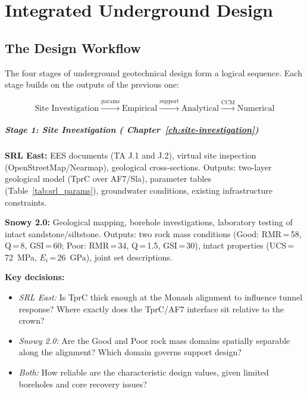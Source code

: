 \chapter{Integrated Underground Design}
\label{ch:integrated-design}

\section{The Design Workflow}

The four stages of underground geotechnical design form a logical sequence. Each stage builds on the outputs of the previous one:

\[
\text{Site Investigation} \xrightarrow{\text{params}} \text{Empirical} \xrightarrow{\text{support}} \text{Analytical} \xrightarrow{\text{CCM}} \text{Numerical}
\]

\paragraph{Stage 1: Site Investigation ( Chapter~\ref{ch:site-investigation})}

\textbf{SRL East:} EES documents (TA J.1 and J.2), virtual site inspection (OpenStreetMap/Nearmap), geological cross-sections. Outputs: two-layer geological model (TprC over AF7/Sla), parameter tables (Table~\ref{tab:srl_params}), groundwater conditions, existing infrastructure constraints.

\textbf{Snowy 2.0:} Geological mapping, borehole investigations, laboratory testing of intact sandstone/siltstone. Outputs: two rock mass conditions (Good: RMR\,=\,58, Q\,=\,8, GSI\,=\,60; Poor: RMR\,=\,34, Q\,=\,1.5, GSI\,=\,30), intact properties (UCS\,=\,72~MPa, $E_i$\,=\,26~GPa), joint set descriptions.

\textbf{Key decisions:}
\begin{itemize}[nosep]
 \item \textit{SRL East:} Is TprC thick enough at the Monash alignment to influence tunnel response? Where exactly does the TprC/AF7 interface sit relative to the crown?
 \item \textit{Snowy 2.0:} Are the Good and Poor rock mass domains spatially separable along the alignment? Which domain governs support design?
 \item \textit{Both:} How reliable are the characteristic design values, given limited boreholes and core recovery issues?
\end{itemize}

